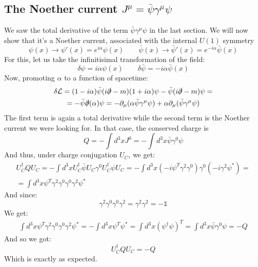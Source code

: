 \documentclass{article}
\begin{document}
\subsection{The Noether current $J^\mu = \bar{\psi} \gamma^\mu \psi$}
We saw the total derivative of the term $\bar{\psi} \gamma^\mu \psi$ in the last section. We will now show that it's a Noether current, associated with the internal $U(1)$ symmetry
\begin{equation}
    \psi(x) \rightarrow \psi'(x) = e^{i\alpha}\psi(x)
    \qquad
    \bar{\psi}(x) \rightarrow \bar{\psi}'(x) = e^{-i\alpha}\bar{\psi}(x)
\end{equation}
For this, let us take the infinitisimal transformation of the field:
\begin{equation}
    \delta \psi = i\alpha\psi(x)
    \qquad
    \delta \bar{\psi} = -i\alpha \bar{\psi}(x)
\end{equation}
Now, promoting $\alpha$ to a function of spacetime:
\begin{equation}
\begin{gathered}
    \delta \mathcal{L} = (1 - i\alpha)\bar{\psi}(i\slashed{\partial} - m)(1 + i\alpha)\psi - \bar{\psi}(i\slashed{\partial} - m)\psi = \\ =
    -\bar{\psi}\slashed{\partial}(\alpha)\psi =
    - \partial_\mu(\alpha\bar{\psi}\gamma^\mu\psi) + \alpha\partial_\mu(\bar{\psi}\gamma^\mu\psi)
\end{gathered}
\end{equation}
The first term is again a total derivative while the second term is the Noether current we were looking for. In that case, the conserved charge is
\begin{equation}
    Q = -\int d^3x J^0 = -\int d^3x \bar{\psi} \gamma^0 \psi
\end{equation}
And thus, under charge conjugation $U_C$, we get:
\begin{equation}
\begin{gathered}
    U_C^\dagger Q U_C = -\int d^3x U_C^\dagger \bar{\psi} U_C \gamma^0 U_C^\dagger \psi U_C = -\int d^3x \left(-i\psi^T \gamma^2\gamma^0\right) \gamma^0 \left(
        -i\gamma^2\psi^*
    \right) = \\ = \int d^3x \psi^T \gamma^2\gamma^0\gamma^0\gamma^2\psi^*
\end{gathered}
\end{equation}
And since:
\begin{equation}
    \gamma^2\gamma^0\gamma^0\gamma^2 = \gamma^2\gamma^2 = -\mathbb{1}
\end{equation}
We get:
\begin{equation}
\begin{gathered}
    \int d^3x \psi^T \gamma^2\gamma^0\gamma^0\gamma^2\psi^* =
    -\int d^3x \psi^T\psi^* =
    \int d^3x \left(\psi^\dagger\psi\right)^T =
    \int d^3x \bar{\psi}\gamma^0\psi = -Q
\end{gathered}
\end{equation}
And so we got:
\begin{equation}
    U_C^\dagger Q U_C = -Q
\end{equation}
Which is exactly as expected.
\end{document}
